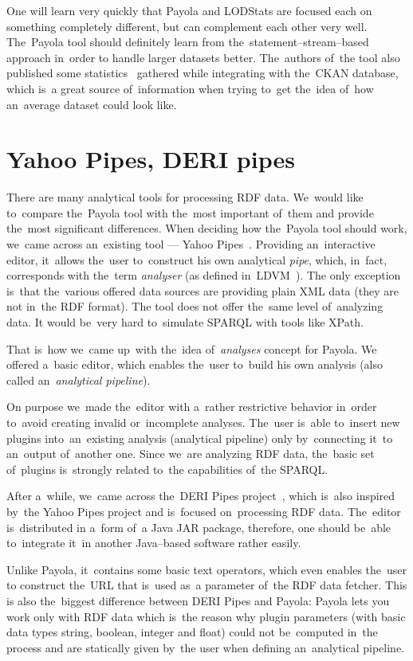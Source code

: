One will learn very quickly that Payola and LODStats are focused each 
on something completely different, but can complement each other very well. The~Payola 
tool should definitely learn from the~statement--stream--based approach in~order 
to handle larger datasets better. The~authors of~the tool also published
some statistics~\cite{lodstats} gathered while integrating with the~CKAN database, which is~a 
great source of~information when trying to~get the~idea of~how an~average dataset 
could look like. 

\section{Yahoo Pipes, DERI pipes}
There are many analytical tools for processing RDF data. We~would like to~compare the~Payola tool with the~most important of~them and provide the~most significant 
differences. When deciding how the~Payola tool should work, we~came 
across an~existing tool --- Yahoo 
Pipes~\cite{yahoo-pipes}. Providing an~interactive 
editor, it~allows the~user to~construct his own analytical \emph{pipe}, 
which, in~fact, corresponds with the~term \emph{analyser} (as defined in~LDVM~\cite{ldvm}).
The only exception is~that the~various offered data sources are
providing plain XML data (they are not in~the RDF format).
The tool does not offer the~same level of~analyzing data.
It would be~very hard to~simulate SPARQL with tools like XPath.

That is~how we~came up~with the~idea of~\emph{analyses} concept for Payola. 
We offered a~basic editor, which enables the~user to~build his own analysis
(also called an~\emph{analytical pipeline}).
 
On purpose we~made the~editor with a~rather restrictive behavior in~order to~avoid creating invalid or~incomplete analyses. The~user is~able to~insert new 
plugins into~an~existing analysis (analytical pipeline) only by~connecting it~to an~output of~another 
one. Since we~are analyzing RDF data, the~basic set of~plugins is~strongly 
related to~the capabilities of~the SPARQL.

After a~while, we~came across the~DERI Pipes 
project~\cite{deri-pipes}, which is~also inspired by~the Yahoo 
Pipes project and is~focused on~processing RDF data. The~editor is~distributed 
in a~form of~a Java JAR package, therefore, one should be~able to~integrate it~in another
Java--based software rather easily.

Unlike Payola, it~contains some basic text operators, which even enables the~user  
to construct the~URL that is~used as~a parameter of~the RDF data fetcher. This 
is also the~biggest difference between DERI Pipes and Payola: Payola lets 
you work only with RDF data which is~the reason why plugin parameters (with basic data types string,
boolean, integer and float) could not be~computed in~the process and are 
statically given by~the user when defining an~analytical pipeline.

